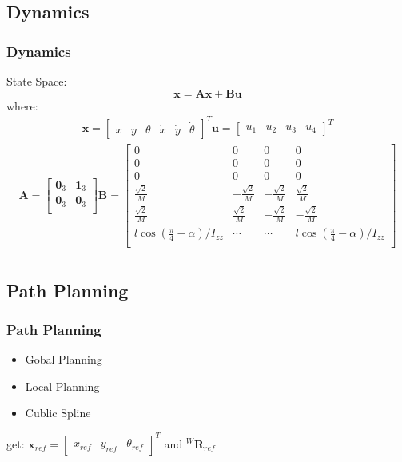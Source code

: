 \documentclass{beamer}
\begin{document}
\subsection{Dynamics}
\begin{frame}
  \frametitle{Dynamics}
  State Space\cite{conceicao2010predictive}:
  \begin{equation}
  \mathbf{\dot x} = \mathbf{Ax}+\mathbf{Bu}
  \end{equation}
  where:
  \begin{eqnarray*}
    \mathbf{x} =
    \begin{bmatrix}
      x& y &\theta &\dot x& \dot y& \dot \theta
      \label{eqa:state}
    \end{bmatrix}^T
    \mathbf{u} =
    \begin{bmatrix}
      u_1& u_2& u_3& u_4
    \end{bmatrix}^T
  \end{eqnarray*}
  \begin{eqnarray*}
    \mathbf{A} =
    \begin{bmatrix}
      \textbf{0}_3 & \textbf{1}_3\\
      \textbf{0}_3 & \textbf{0}_3\\
    \end{bmatrix}
    \mathbf{B} =
    \begin{bmatrix}
      0 & 0 & 0 & 0\\
      0 & 0 & 0 & 0\\
      0 & 0 & 0 & 0\\
      \frac{\sqrt{2}}{M}& -\frac{\sqrt{2}}{M}& -\frac{\sqrt{2}}{M}& \frac{\sqrt{2}}{M}\\
      \frac{\sqrt{2}}{M}& \frac{\sqrt{2}}{M}& -\frac{\sqrt{2}}{M}& -\frac{\sqrt{2}}{M}\\
      l\cos(\frac{\pi}{4}-\alpha)/I_{zz}& \cdots &\cdots &l\cos(\frac{\pi}{4}-\alpha)/I_{zz}\\
    \end{bmatrix}\\
  \end{eqnarray*}

\end{frame}

\subsection{Path Planning}
\begin{frame}
\frametitle{Path Planning}
\begin{itemize}
  \item Gobal Planning
  \item Local Planning
  \item Cublic Spline
\end{itemize}
get: $\textbf{x}_{ref} = \begin{bmatrix}
  x_{ref}& y_{ref}& \theta_{ref}
\end{bmatrix}^T$
and $^W\mathbf{R}_{ref}$
\end{frame}
\end{document}
